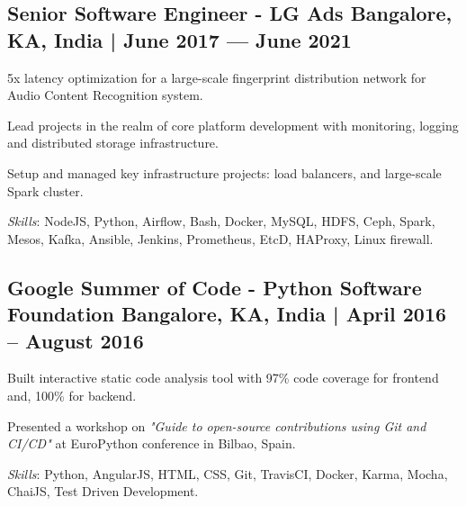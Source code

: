\subsection{{Senior Software Engineer - LG Ads \hfill Bangalore, KA, India | June 2017 --- June 2021}}
\begin{zitemize}
\item 5x latency optimization for a large-scale fingerprint distribution network for Audio Content Recognition system.
\item Lead projects in the realm of core platform development with monitoring, logging and distributed storage infrastructure. 
\item Setup and managed key infrastructure projects: load balancers, and large-scale Spark cluster.
\end{zitemize}

\textit{Skills}: NodeJS, Python, Airflow, Bash, Docker, MySQL, HDFS, Ceph, Spark, Mesos, Kafka, Ansible, Jenkins, Prometheus, EtcD, HAProxy, Linux firewall.
\vspace*{1mm}

\subsection{{Google Summer of Code - Python Software Foundation \hfill Bangalore, KA, India | April 2016 -- August 2016}}
\begin{zitemize}
\item Built interactive static code analysis tool with 97\% code coverage for frontend and, 100\% for backend.
\item Presented a workshop on \textit{"Guide to open-source contributions using Git and CI/CD"} at EuroPython conference in Bilbao, Spain.
\end{zitemize}
\textit{Skills}: Python, AngularJS, HTML, CSS, Git, TravisCI, Docker, Karma, Mocha, ChaiJS, Test Driven Development.
